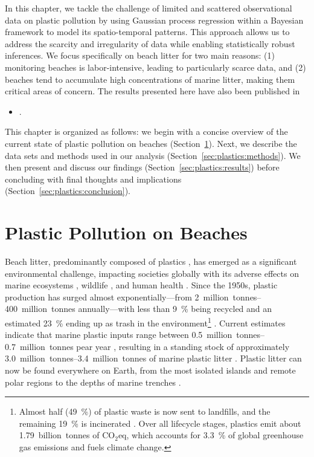 In this chapter, we tackle the challenge of limited and scattered observational data on plastic pollution by using Gaussian process regression within a Bayesian framework to model its spatio-temporal patterns. This approach allows us to address the scarcity and irregularity of data while enabling statistically robust inferences. We focus specifically on beach litter for two main reasons: (1) monitoring beaches is labor-intensive, leading to particularly scarce data, and (2) beaches tend to accumulate high concentrations of marine litter, making them critical areas of concern. The results presented here have also been published in

\begin{itemize}
    \item {}.
\end{itemize}


This chapter is organized as follows: we begin with a concise overview of the current state of plastic pollution on beaches (Section~\ref{sec:plastics:introduction}). Next, we describe the data sets and methods used in our analysis (Section~\ref{sec:plastics:methods}). We then present and discuss our findings (Section~\ref{sec:plastics:results}) before concluding with final thoughts and implications (Section~\ref{sec:plastics:conclusion}).

\section{Plastic Pollution on Beaches}\label{sec:plastics:introduction}

Beach litter, predominantly composed of plastics \cite{morales-caselles_inshoreoffshore_2021, lacroix_abundance_2023}, has emerged as a significant environmental challenge, impacting societies globally with its adverse effects on marine ecosystems \cite{chenet_plastic_2021}, wildlife \cite{thiel_impacts_2018,alexiadou_ingestion_2019,barboza_microplastics_2020}, and human health \cite{van_cauwenberghe_microplastics_2014,rochman_anthropogenic_2015,huang_microplastics_2025}. Since the 1950s, plastic production has surged almost exponentially---from \qtyrange{2}{400}{million~tonnes} annually---with less than \qty{9}{\percent} being recycled and an estimated \qty{23}{\percent} ending up as trash in the environment\footnote{Almost half (\qty{49}{\percent}) of plastic waste is now sent to landfills, and the remaining \qty{19}{\percent} is incinerated \cite{oecd_global_2023}. Over all lifecycle stages, plastics emit about \qty{1.79}{billion~tonnes} of CO$_2$eq, which accounts for \qty{3.3}{\percent} of global greenhouse gas emissions and fuels climate change.} \cite{geyer_production_2017,geyer_production_2020,oecd_global_2023}. Current estimates indicate that marine plastic inputs range between \qtyrange{0.5}{0.7}{million~tonnes} pear year \cite{kaandorp_global_2023, zhang_plastic_2023}, resulting in a standing stock of approximately \qtyrange{3.0}{3.4}{million~tonnes} of marine plastic litter \cite{kaandorp_global_2023}. Plastic litter can now be found everywhere on Earth, from the most isolated islands \cite{imhof_spatial_2017} and remote polar regions \cite{waller_microplastics_2017} to the depths of marine trenches \cite{chiba_human_2018}.

